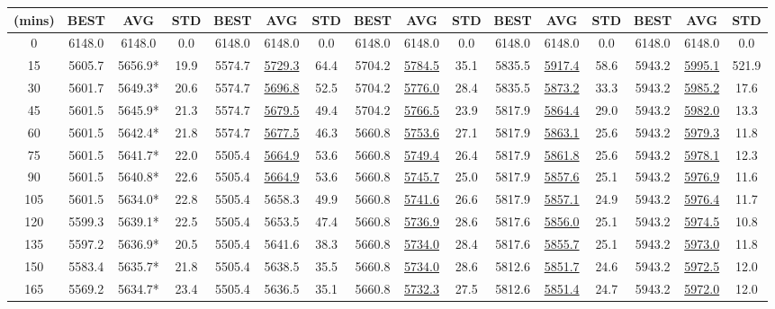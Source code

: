 \documentclass[journal]{IEEEtran}
\begin{document}
\begin{table}[htbp]
\begin{tabular}{|c|ccc|ccc|ccc|ccc|ccc|}
		(mins)& BEST & AVG & STD & BEST & AVG & STD & BEST & AVG & STD & BEST & AVG & STD & BEST & AVG & STD  \\
		\hline
		0 & 6148.0 & 6148.0 & 0.0 & 6148.0 & 6148.0 & 0.0 & 6148.0 & 6148.0 & 0.0 & 6148.0 & 6148.0 & 0.0 & 6148.0 & 6148.0 & 0.0 \\
		15 & 5605.7 & 5656.9* & 19.9 & 5574.7 & \underline{5729.3} & 64.4 & 5704.2 & \underline{5784.5} & 35.1 & 5835.5 & \underline{5917.4} & 58.6 & 5943.2 & \underline{5995.1} & 521.9 \\
		30 & 5601.7 & 5649.3* & 20.6 & 5574.7 & \underline{5696.8} & 52.5 & 5704.2 & \underline{5776.0} & 28.4 & 5835.5 & \underline{5873.2} & 33.3 & 5943.2 & \underline{5985.2} & 17.6 \\
		45 & 5601.5 & 5645.9* & 21.3 & 5574.7 & \underline{5679.5} & 49.4 & 5704.2 & \underline{5766.5} & 23.9 & 5817.9 & \underline{5864.4} & 29.0 & 5943.2 & \underline{5982.0} & 13.3 \\
		60 & 5601.5 & 5642.4* & 21.8 & 5574.7 & \underline{5677.5} & 46.3 & 5660.8 & \underline{5753.6} & 27.1 & 5817.9 & \underline{5863.1} & 25.6 & 5943.2 & \underline{5979.3} & 11.8 \\
		75 & 5601.5 & 5641.7* & 22.0 & 5505.4 & \underline{5664.9} & 53.6 & 5660.8 & \underline{5749.4} & 26.4 & 5817.9 & \underline{5861.8} & 25.6 & 5943.2 & \underline{5978.1} & 12.3 \\
		90 & 5601.5 & 5640.8* & 22.6 & 5505.4 & \underline{5664.9} & 53.6 & 5660.8 & \underline{5745.7} & 25.0 & 5817.9 & \underline{5857.6} & 25.1 & 5943.2 & \underline{5976.9} & 11.6 \\
		105 & 5601.5 & 5634.0* & 22.8 & 5505.4 & 5658.3 & 49.9 & 5660.8 & \underline{5741.6} & 26.6 & 5817.9 & \underline{5857.1} & 24.9 & 5943.2 & \underline{5976.4} & 11.7 \\
		120 & 5599.3 & 5639.1* & 22.5 & 5505.4 & 5653.5 & 47.4 & 5660.8 & \underline{5736.9} & 28.6 & 5817.6 & \underline{5856.0} & 25.1 & 5943.2 & \underline{5974.5} & 10.8 \\
		135 & 5597.2 & 5636.9* & 20.5 & 5505.4 & 5641.6 & 38.3 & 5660.8 & \underline{5734.0} & 28.4 & 5817.6 & \underline{5855.7} & 25.1 & 5943.2 & \underline{5973.0} & 11.8 \\
		150 & 5583.4 & 5635.7* & 21.8 & 5505.4 & 5638.5 & 35.5 & 5660.8 & \underline{5734.0} & 28.6 & 5812.6 & \underline{5851.7} & 24.6 & 5943.2 & \underline{5972.5} & 12.0 \\
		165 & 5569.2 & 5634.7* & 23.4 & 5505.4 & 5636.5 & 35.1 & 5660.8 & \underline{5732.3} & 27.5 & 5812.6 & \underline{5851.4} & 24.7 & 5943.2 & \underline{5972.0} & 12.0 \\

\end{tabular}
\end{table}
\end{document}
